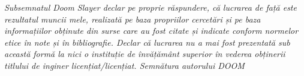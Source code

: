 \begin{titlepage}
    
    {\large \itshape 
    Subsemnatul Doom Slayer declar pe proprie răspundere, că lucrarea de față este rezultatul muncii mele, realizată pe baza propriilor cercetări și pe baza informațiilor obținute din surse care au fost citate și indicate conform normelor etice în note și în bibliografie.
    Declar că lucrarea nu a mai fost prezentată sub această formă la nici o instituție de învățământ superior în vederea obținerii titlului de inginer licențiat/licențiat. 
    Semnătura autorului DOOM
    }

\end{titlepage}
